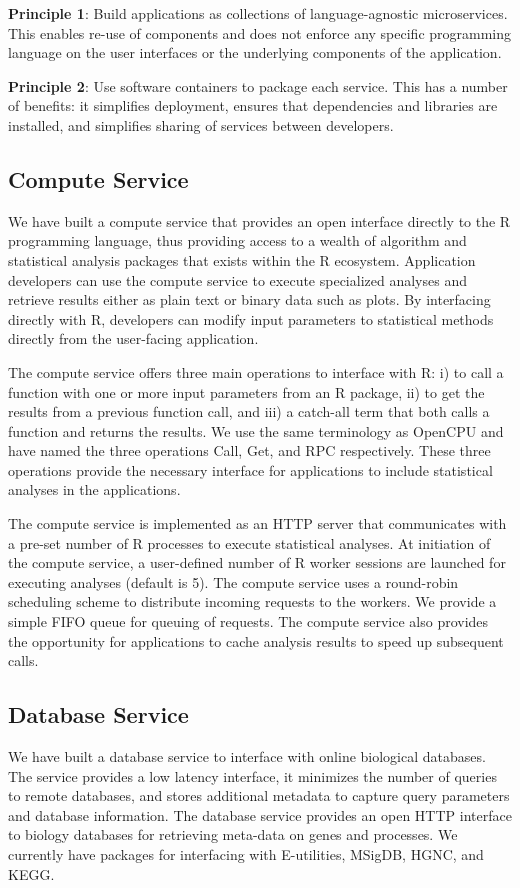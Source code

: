 \textbf{Principle 1}: Build applications as collections of language-agnostic
microservices. This enables re-use of components and does not enforce any
specific programming language on the user interfaces or the underlying
components of the application. 

\textbf{Principle 2}: Use software containers to package each service. This has
a number of benefits: it simplifies deployment, ensures that dependencies and
libraries are installed, and  simplifies sharing of services between
developers. 

\subsection{Compute Service}
We have built a compute service that provides an open interface directly to the
R programming language, thus providing access to a wealth of algorithm and
statistical analysis packages that exists within the R ecosystem.  
Application developers can use the compute service to execute specialized
analyses and retrieve results either as plain text or binary data such as plots.
By interfacing directly with R, developers can modify input parameters to
statistical methods directly from the user-facing application. 

The compute service offers three main operations to interface with R: i) to call
a function with one or more input parameters from an R package, ii) to get the
results from a previous function call, and iii) a catch-all term that both calls
a function and returns the results.  We use the same terminology as
OpenCPU\cite{opencpu} and have named the three operations Call, Get, and RPC
respectively. These three operations provide the necessary interface for
applications to include statistical analyses in the applications.

The compute service is implemented as an HTTP server that communicates with a
pre-set number of R processes to execute statistical analyses. 
At initiation of the compute service, a user-defined number of R worker sessions
are launched for executing analyses (default is 5).  
The compute service uses a round-robin scheduling scheme to distribute incoming
requests to the workers. We provide a simple FIFO queue for queuing of requests.
The compute service also provides the opportunity for applications to cache
analysis results to speed up subsequent calls. 

\subsection{Database Service} 
We have built a database service to interface with online biological databases.
The service provides a low latency interface, it minimizes the number of queries
to remote databases, and stores additional metadata to capture query parameters
and database information.  The database service provides an open HTTP interface
to biology databases for retrieving meta-data on genes and processes.  We
currently have packages for interfacing with E-utilities\cite{sayers2009entrez},
MSigDB, HGNC\cite{gray2014genenames}, and KEGG.

